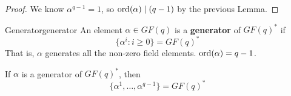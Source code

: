 \begin{proof}
    We know $ \alpha^{q-1}=1 $, so $ \operatorname{ord}(\alpha)\mid (q-1) $ by
    the previous Lemma.
\end{proof}

\begin{Definition}{Generator}{generator}
    An element $ \alpha\in GF(q) $ is a \textbf{generator} of
    $ GF(q)^* $ if
    \[ \{\alpha^i:i\geqslant 0\}=GF(q)^* \]
    That is, $ \alpha $ generates all the non-zero field elements.
    $ \operatorname{ord}(\alpha)=q-1 $.
\end{Definition}

\begin{Theorem}{}{}
    If $ \alpha $ is a generator of $ GF(q)^* $, then
    \[ \{\alpha^1,\ldots ,\alpha^{q-1}\}=GF(q)^* \]
\end{Theorem}

